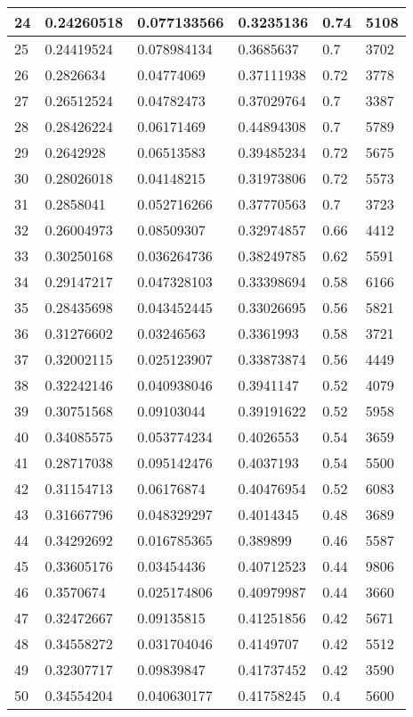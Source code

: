 \begin{longtable}{|l|l|l|l|l|l|}
24 & 0.24260518 & 0.077133566 & 0.3235136 & 0.74 & 5108 \\ \hline 
25 & 0.24419524 & 0.078984134 & 0.3685637 & 0.7 & 3702 \\ \hline 
26 & 0.2826634 & 0.04774069 & 0.37111938 & 0.72 & 3778 \\ \hline 
27 & 0.26512524 & 0.04782473 & 0.37029764 & 0.7 & 3387 \\ \hline 
28 & 0.28426224 & 0.06171469 & 0.44894308 & 0.7 & 5789 \\ \hline 
29 & 0.2642928 & 0.06513583 & 0.39485234 & 0.72 & 5675 \\ \hline 
30 & 0.28026018 & 0.04148215 & 0.31973806 & 0.72 & 5573 \\ \hline 
31 & 0.2858041 & 0.052716266 & 0.37770563 & 0.7 & 3723 \\ \hline 
32 & 0.26004973 & 0.08509307 & 0.32974857 & 0.66 & 4412 \\ \hline 
33 & 0.30250168 & 0.036264736 & 0.38249785 & 0.62 & 5591 \\ \hline 
34 & 0.29147217 & 0.047328103 & 0.33398694 & 0.58 & 6166 \\ \hline 
35 & 0.28435698 & 0.043452445 & 0.33026695 & 0.56 & 5821 \\ \hline 
36 & 0.31276602 & 0.03246563 & 0.3361993 & 0.58 & 3721 \\ \hline 
37 & 0.32002115 & 0.025123907 & 0.33873874 & 0.56 & 4449 \\ \hline 
38 & 0.32242146 & 0.040938046 & 0.3941147 & 0.52 & 4079 \\ \hline 
39 & 0.30751568 & 0.09103044 & 0.39191622 & 0.52 & 5958 \\ \hline 
40 & 0.34085575 & 0.053774234 & 0.4026553 & 0.54 & 3659 \\ \hline 
41 & 0.28717038 & 0.095142476 & 0.4037193 & 0.54 & 5500 \\ \hline 
42 & 0.31154713 & 0.06176874 & 0.40476954 & 0.52 & 6083 \\ \hline 
43 & 0.31667796 & 0.048329297 & 0.4014345 & 0.48 & 3689 \\ \hline 
44 & 0.34292692 & 0.016785365 & 0.389899 & 0.46 & 5587 \\ \hline 
45 & 0.33605176 & 0.03454436 & 0.40712523 & 0.44 & 9806 \\ \hline 
46 & 0.3570674 & 0.025174806 & 0.40979987 & 0.44 & 3660 \\ \hline 
47 & 0.32472667 & 0.09135815 & 0.41251856 & 0.42 & 5671 \\ \hline 
48 & 0.34558272 & 0.031704046 & 0.4149707 & 0.42 & 5512 \\ \hline 
49 & 0.32307717 & 0.09839847 & 0.41737452 & 0.42 & 3590 \\ \hline 
50 & 0.34554204 & 0.040630177 & 0.41758245 & 0.4 & 5600 \\ \hline 
\end{longtable}